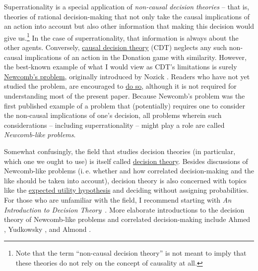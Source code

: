 Superrationality is a special application of \emph{non-causal decision
theories} -- that is, theories of rational decision-making that not only
take the causal implications of an action into account but also other
information that making this decision would give us.\footnote{Note
  that the term ``non-causal decision theory'' is not meant to imply
  that these theories do not rely on the concept of causality at all.}
In the case of superrationality, that information is always about the
other agents. Conversely,
\href{https://en.wikipedia.org/wiki/Causal_decision_theory}{causal
decision theory} (CDT)
\parencite{Weirich2016-gq,Joyce1999-iv,Lewis1981-ct,Skyrms1982-mi,Gibbard1978-nw}
neglects any such non-causal implications of an action in the Donation
game with similarity. However, the best-known example of what I would
view as CDT's limitations is surely
\href{https://en.wikipedia.org/wiki/Newcomb\%27s_paradox}{Newcomb's
problem}, originally introduced by Nozick 
\citeyear{Nozick1969-op}. Readers who have not yet studied
the problem, are encouraged to
\href{http://lesswrong.com/lw/nc/newcombs_problem_and_regret_of_rationality/}{do
so}, although it is not required for understanding most of the present
paper. Because Newcomb's problem was the first published example of a
problem that (potentially) requires one to consider the non-causal
implications of one's decision, all problems wherein such considerations
-- including superrationality -- might play a role are called
\emph{Newcomb-like} \emph{problems}.

Somewhat confusingly, the field that studies decision theories (in
particular, which one we ought to use) is itself called
\href{https://en.wikipedia.org/wiki/Decision_theory}{decision
theory}. Besides discussions of Newcomb-like problems (i.\,e. whether
and how correlated decision-making and the like should be taken into
account), decision theory is also concerned with topics like the
\href{https://en.wikipedia.org/wiki/Expected_utility_hypothesis}{expected
utility hypothesis} and deciding without assigning probabilities. For
those who are unfamiliar with the field, I recommend starting with \emph{An Introduction to Decision
Theory}~\parencite{Peterson2017-pa}. More elaborate introductions to the decision theory of
Newcomb-like problems and correlated decision-making include Ahmed \citeyear{Ahmed2014-ec},
Yudkowsky \citeyear{Yudkowsky2010-ky}, and
Almond \citeyear{Almond2010-xn}.

